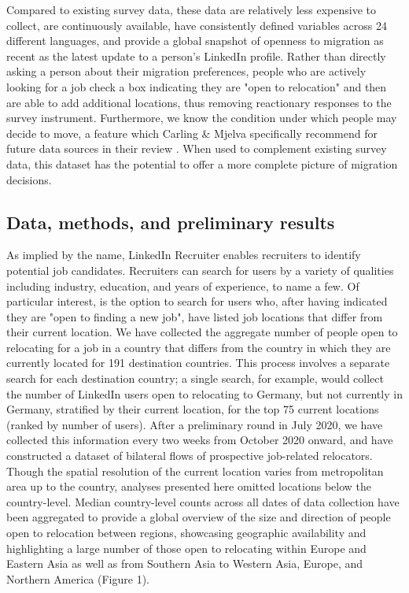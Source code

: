 Compared to existing survey data, these data are relatively less expensive to collect, are continuously available, have consistently defined variables across 24 different languages, and provide a global snapshot of openness to migration as recent as the latest update to a person’s LinkedIn profile. Rather than directly asking a person about their migration preferences, people who are actively looking for a job check a box indicating they are "open to relocation" and then are able to add additional locations, thus removing reactionary responses to the survey instrument. Furthermore, we know the condition under which people may decide to move, a feature which Carling \& Mjelva specifically recommend for future data sources in their review \cite{carlingSurveyInstrumentsSurvey2021}. When used to complement existing survey data, this dataset has the potential to offer a more complete picture of migration decisions.

\subsection*{Data, methods, and preliminary results}
As implied by the name, LinkedIn Recruiter enables recruiters to identify potential job candidates. Recruiters can search for users by a variety of qualities including industry, education, and years of experience, to name a few. Of particular interest, is the option to search for users who, after having indicated they are "open to finding a new job", have listed job locations that differ from their current location. We have collected the aggregate number of people open to relocating for a job in a country that differs from the country in which they are currently located for 191 destination countries. This process involves a separate search for each destination country; a single search, for example, would collect the number of LinkedIn users open to relocating to Germany, but not currently in Germany, stratified by their current location, for the top 75 current locations (ranked by number of users). After a preliminary round in July 2020, we have collected this information every two weeks from October 2020 onward, and have constructed a dataset of bilateral flows of prospective job-related relocators. Though the spatial resolution of the current location varies from metropolitan area up to the country, analyses presented here omitted locations below the country-level. Median country-level counts across all dates of data collection have been aggregated to provide a global overview of the size and direction of people open to relocation between regions, showcasing geographic availability and highlighting a large number of those open to relocating within Europe and Eastern Asia as well as from Southern Asia to Western Asia, Europe, and Northern America (Figure 1).

